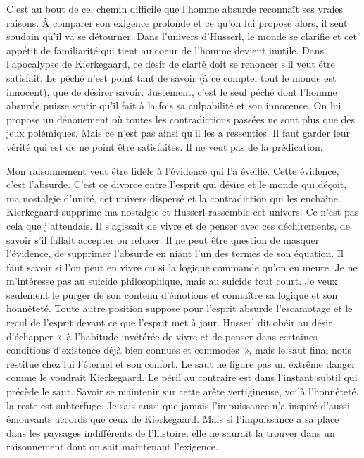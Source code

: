 \documentclass{book}
\begin{document}
C'est au bout de ce, chemin difficile que l'homme absurde reconnaît ses vraies raisons. À comparer son exigence profonde et ce qu'on lui propose alors, il sent soudain qu'il va se détourner. Dans l'univers d'Husserl, le monde se clarifie et cet appétit de familiarité qui tient au coeur de l'homme devient inutile. Dans l'apocalypse de Kierkegaard, ce désir de clarté doit se renoncer s'il veut être satisfait. Le péché n'est point tant de savoir (à ce compte, tout le monde est innocent), que de désirer savoir. Justement, c'est le seul péché dont l'homme absurde puisse sentir qu'il fait à la fois sa culpabilité et son innocence. On lui propose un dénouement où toutes les contradictions passées ne sont plus que des jeux polémiques. Mais ce n'est pas ainsi qu'il les a ressenties. Il faut garder leur vérité qui est de ne point être satisfaites. Il ne veut pas de la prédication.

Mon raisonnement veut être fidèle à l'évidence qui l'a éveillé. Cette évidence, c'est l'absurde. C'est ce divorce entre l'esprit qui désire et le monde qui déçoit, ma nostalgie d'unité, cet univers dispersé et la contradiction qui les enchaîne. Kierkegaard supprime ma nostalgie et Husserl rassemble cet univers. Ce n'est pas cela que j'attendais. Il s'agissait de vivre et de penser avec ces déchirements, de savoir s'il fallait accepter ou refuser. Il ne peut être question de masquer l'évidence, de supprimer l'absurde en niant l'un des termes de son équation. Il faut savoir si l'on peut en vivre ou si la logique commande qu'on en meure. Je ne m'intéresse pas au suicide philosophique, mais au suicide tout court. Je veux seulement le purger de son contenu d'émotions et connaître sa logique et son honnêteté. Toute autre position suppose pour l'esprit absurde l'escamotage et le recul de l'esprit devant ce que l'esprit met à jour. Husserl dit obéir au désir d'échapper « à l'habitude invétérée de vivre et de penser dans certaines conditions d'existence déjà bien connues et commodes », mais le saut final nous restitue chez lui l'éternel et son confort. Le saut ne figure pas un extrême danger comme le voudrait Kierkegaard. Le péril au contraire est dans l'instant subtil qui précède le saut. Savoir se maintenir sur cette arête vertigineuse, voilà l'honnêteté, la reste est subterfuge. Je sais aussi que jamais l'impuissance n'a inspiré d'aussi émouvants accords que ceux de Kierkegaard. Mais si l'impuissance a sa place dans les paysages indifférents de l'histoire, elle ne saurait la trouver dans un raisonnement dont on sait maintenant l'exigence.
\end{document}

